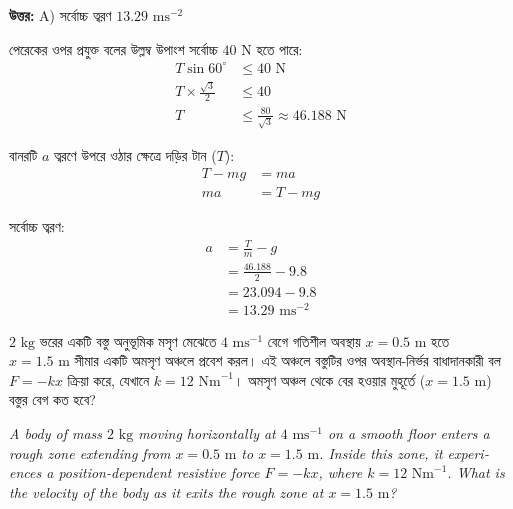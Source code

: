 \documentclass[12pt, a4paper]{article}
\begin{document}
\vspace{0.5em}
\begin{tcolorbox}[answerbox]
    \textbf{\color{success} উত্তর:} A) সর্বোচ্চ ত্বরণ $13.29\text{ ms}^{-2}$
\end{tcolorbox}
\vspace{1em}

\begin{tcolorbox}[solutionbox={সমাধান (Solution)}]
    \noindent
    পেরেকের ওপর প্রযুক্ত বলের উল্লম্ব উপাংশ সর্বোচ্চ $40\text{ N}$ হতে পারে:
    \begin{align*}
        T \sin 60^\circ &\le 40\text{ N} \\
        T \times \frac{\sqrt{3}}{2} &\le 40 \\
        T &\le \frac{80}{\sqrt{3}} \approx 46.188\text{ N}
    \end{align*}
    
    বানরটি $a$ ত্বরণে উপরে ওঠার ক্ষেত্রে দড়ির টান ($T$):
    \begin{align*}
        T - mg &= ma \\
        ma &= T - mg
    \end{align*}
    
    সর্বোচ্চ ত্বরণ:
    \begin{align*}
        a &= \frac{T}{m} - g \\
          &= \frac{46.188}{2} - 9.8 \\
          &= 23.094 - 9.8 \\
          &= \mathbf{13.29}\text{ ms}^{-2}
    \end{align*}
\end{tcolorbox}

\newpage

\begin{tcolorbox}[questionbox={প্রশ্ন (Question) 20}]
    \noindent
    $2\text{ kg}$ ভরের একটি বস্তু অনুভূমিক মসৃণ মেঝেতে $4\text{ ms}^{-1}$ বেগে গতিশীল অবস্থায় $x = 0.5\text{ m}$ হতে $x = 1.5\text{ m}$ সীমার একটি অমসৃণ অঞ্চলে প্রবেশ করল। এই অঞ্চলে বস্তুটির ওপর অবস্থান-নির্ভর বাধাদানকারী বল $F = -kx$ ক্রিয়া করে, যেখানে $k = 12\text{ Nm}^{-1}$। অমসৃণ অঞ্চল থেকে বের হওয়ার মুহূর্তে ($x = 1.5\text{ m}$) বস্তুর বেগ কত হবে?
    
    \vspace{0.8em}
    \begin{english}
    \noindent\textit{\color{darkgray}
    A body of mass $2\text{ kg}$ moving horizontally at $4\text{ ms}^{-1}$ on a smooth floor enters a rough zone extending from $x = 0.5\text{ m}$ to $x = 1.5\text{ m}$. Inside this zone, it experiences a position-dependent resistive force $F = -kx$, where $k = 12\text{ Nm}^{-1}$. What is the velocity of the body as it exits the rough zone at $x = 1.5\text{ m}$?
    }
    \end{english}
\end{tcolorbox}
\end{document}
